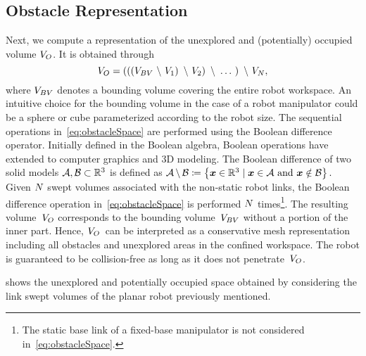 \subsection{Obstacle Representation}
\label{subsec:obstacleRepresentation}
Next, we compute a representation of the unexplored and (potentially) occupied volume ${V_{O}}$.
It is obtained through
\begin{equation}
	\label{eq:obstacleSpace}
	{V_{O}}=
	\left(
	\left(  
	\left(
	{V_{BV}}
	~\backslash~
	{V_{1}}
	\right)
	~\backslash~
	{V_{2}}
	\right)
	~\backslash~
	\ldots~
	\right)
	~\backslash~
	{V_{{N}}},
\end{equation}
where ${V_{BV}}$ denotes a bounding volume covering the entire robot workspace.
An intuitive choice for the bounding volume in the case of a robot manipulator could be a sphere or cube parameterized according to the robot size.
The sequential operations in~\eqref{eq:obstacleSpace} are performed using the Boolean difference operator.
Initially defined in the Boolean algebra, 
Boolean operations have extended to computer graphics and 3D modeling.
The Boolean difference of two solid models 
$\mathcal{A},\mathcal{B}\subset\mathbb{R}^{3}$ 
is defined as
$ %
	\mathcal{A}\,\backslash\,\mathcal{B} \coloneq
	\left\{
	\bm{x} \inR{3} 
	\mid 
	\bm{x} \in \mathcal{A}
	~\mathrm{and}~
	\bm{x} \notin \mathcal{B}
	\right\}.
$ %
Given ${N}$ swept volumes associated with the non-static robot links, 
the Boolean difference operation in~\eqref{eq:obstacleSpace} is performed ${N}$ times\footnote{The 
static base link of a fixed-base manipulator is not considered in~\eqref{eq:obstacleSpace}.}.
The resulting volume~${V_{O}}$ %
corresponds to the bounding volume~${V_{BV}}$
without a portion of the inner part.
Hence, 
${V_{O}}$~can be interpreted as a conservative mesh representation including all obstacles and unexplored areas in the confined workspace.
The robot is guaranteed to be collision-free as long as it does not penetrate~${V_{O}}$.

 shows the unexplored and potentially occupied space 
obtained by considering the link swept volumes of the planar robot previously mentioned.

